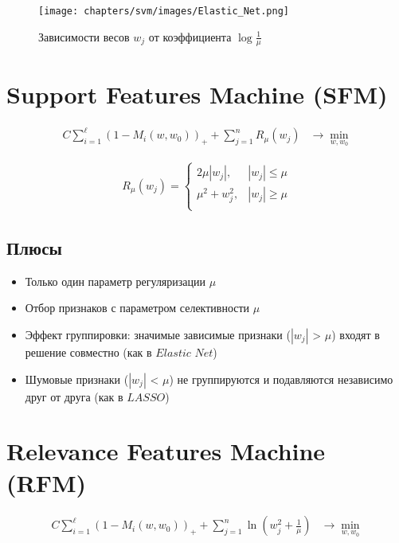 \begin{figure}[ht]
    \centering
    \texttt{[image: chapters/svm/images/Elastic\_Net.png]}
    \caption{Зависимости весов \(w_j\) от коэффициента \(\log \frac{1}{\mu}\)}
    \label{fig:elastic_net}
\end{figure}

\section{Support Features Machine (SFM)}

\begin{align*}
    C \sum_{i=1}^{\ell} \left(1 - M_i(w, w_0)\right)_+ + \sum_{j=1}^{n} R_{\mu}(w_{j}) & \rightarrow \min_{w, w_0}
\end{align*}

\begin{align*}
R_{\mu}(w_j)=
    \begin{cases}
        2\mu |w_j|, & |w_j| \leq \mu\\
        \mu^2 + w_j^2, & |w_j| \geq \mu \\
    \end{cases}
\end{align*}

\subsection*{Плюсы}
\begin{itemize}
    \item Только один параметр регуляризации \(\mu\)
    \item Отбор признаков с параметром селективности \(\mu\)
    \item Эффект группировки: значимые зависимые признаки ($|w_j|$ > \(\mu\)) входят в решение совместно (как в $Elastic$ $Net$)
    \item Шумовые признаки ($|w_j|$ < \(\mu\)) не группируются и подавляются независимо друг от друга (как в $LASSO$)
\end{itemize}

\section{Relevance Features Machine (RFM)}

\begin{align*}
    C \sum_{i=1}^{\ell} \left(1 - M_i(w, w_0)\right)_+ + \sum_{j=1}^{n} \ln(w_j^2 + \frac{1}{\mu}) & \rightarrow \min_{w, w_0}
\end{align*}

